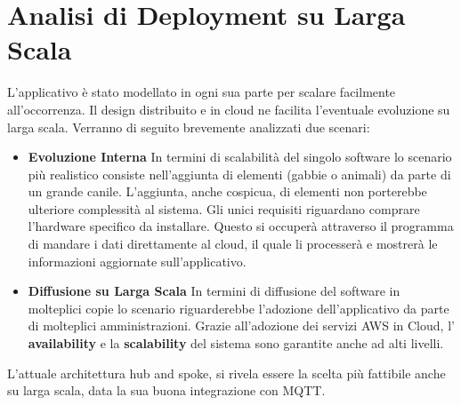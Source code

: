 

\chapter{Analisi di Deployment su Larga Scala}
L'applicativo è stato modellato in ogni sua parte per scalare facilmente all'occorrenza. Il design distribuito e in cloud ne facilita l'eventuale evoluzione su larga scala.
Verranno di seguito brevemente analizzati due scenari: 
\begin{itemize}
    \item  \textbf{Evoluzione Interna} In termini di scalabilità del singolo software lo scenario più realistico consiste nell'aggiunta di elementi (gabbie o animali) da parte di un grande canile. L'aggiunta, anche cospicua, di elementi non porterebbe ulteriore complessità al sistema. Gli unici requisiti riguardano comprare l'hardware specifico da installare. Questo si occuperà attraverso il programma di mandare i dati direttamente al cloud, il quale li processerà e mostrerà le informazioni aggiornate sull'applicativo.
    
    \item  \textbf{Diffusione su Larga Scala} In termini di diffusione del software in molteplici copie lo scenario riguarderebbe l'adozione dell'applicativo da parte di molteplici amministrazioni. Grazie all'adozione dei servizi AWS in Cloud, l' \textbf{availability} e la \textbf{scalability} del sistema sono garantite anche ad alti livelli.
\end{itemize}
 
L'attuale architettura hub and spoke, si rivela essere la scelta più fattibile anche su larga scala, data la sua buona integrazione con MQTT.
 
